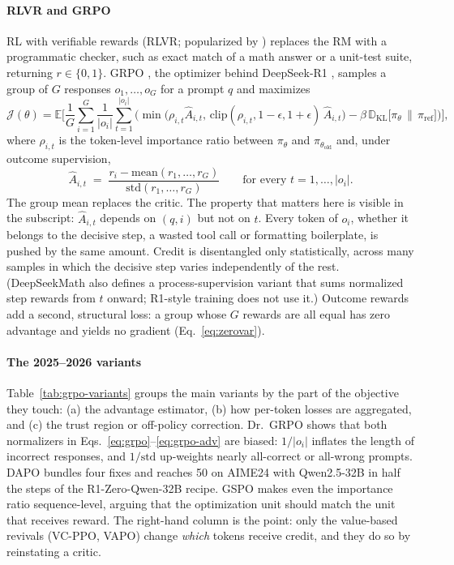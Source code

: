 \paragraph{RLVR and GRPO}
RL with verifiable rewards (RLVR; popularized by \citealp{lambert2024tulu}) replaces the RM with a programmatic checker, such as exact match of a math answer or a unit-test suite, returning $r\in\{0,1\}$. GRPO \citep{shao2024deepseekmath}, the optimizer behind DeepSeek-R1 \citep{deepseekai2025deepseek}, samples a group of $G$ responses $o_1,\dots,o_G$ for a prompt $q$ and maximizes
\begin{equation}\label{eq:grpo}
\mathcal{J}(\theta)=\mathbb{E}\Bigg[\frac{1}{G}\sum_{i=1}^{G}\frac{1}{|o_i|}\sum_{t=1}^{|o_i|}\Big(\min\big(\rho_{i,t}\hat A_{i,t},\,\mathrm{clip}(\rho_{i,t},1-\epsilon,1+\epsilon)\,\hat A_{i,t}\big)-\beta\,\mathbb{D}_{\mathrm{KL}}\big[\pi_\theta\,\|\,\pi_{\mathrm{ref}}\big]\Big)\Bigg],
\end{equation}
where $\rho_{i,t}$ is the token-level importance ratio between $\pi_\theta$ and $\pi_{\theta_{\mathrm{old}}}$ and, under outcome supervision,
\begin{equation}\label{eq:grpo-adv}
\hat A_{i,t}\;=\;\frac{r_i-\mathrm{mean}(r_1,\dots,r_G)}{\mathrm{std}(r_1,\dots,r_G)}\qquad\text{for every } t=1,\dots,|o_i|.
\end{equation}
The group mean replaces the critic. The property that matters here is visible in the subscript: $\hat A_{i,t}$ depends on $(q,i)$ but not on $t$. Every token of $o_i$, whether it belongs to the decisive step, a wasted tool call or formatting boilerplate, is pushed by the same amount. Credit is disentangled only statistically, across many samples in which the decisive step varies independently of the rest. (DeepSeekMath also defines a process-supervision variant that sums normalized step rewards from $t$ onward\unverified; R1-style training does not use it.) Outcome rewards add a second, structural loss: a group whose $G$ rewards are all equal has zero advantage and yields no gradient (Eq.~\ref{eq:zerovar}).

\paragraph{The 2025--2026 variants}
Table~\ref{tab:grpo-variants} groups the main variants by the part of the objective they touch: (a) the advantage estimator, (b) how per-token losses are aggregated, and (c) the trust region or off-policy correction. Dr.~GRPO \citep{liu2025understanding} shows that both normalizers in Eqs.~\ref{eq:grpo}--\ref{eq:grpo-adv} are biased: $1/|o_i|$ inflates the length of incorrect responses, and $1/\mathrm{std}$ up-weights nearly all-correct or all-wrong prompts. DAPO \citep{yu2025dapo} bundles four fixes and reaches 50 on AIME24 with Qwen2.5-32B in half the steps of the R1-Zero-Qwen-32B recipe. GSPO \citep{zheng2025group} makes even the importance ratio sequence-level, arguing that the optimization unit should match the unit that receives reward. The right-hand column is the point: only the value-based revivals (VC-PPO, VAPO) change \emph{which} tokens receive credit, and they do so by reinstating a critic.

